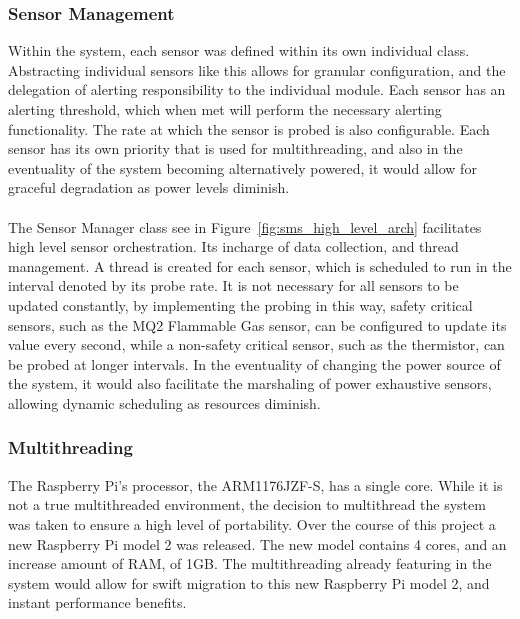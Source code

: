 \documentclass{article}
\begin{document}
\subsubsection{Sensor Management}
Within the system, each sensor was defined within its own individual class. Abstracting individual sensors like this allows for granular configuration, and the delegation of alerting responsibility to the individual module. Each sensor has an alerting threshold, which when met will perform the necessary alerting functionality. The rate at which the sensor is probed is also configurable. Each sensor has its own priority that is used for multithreading, and also in the eventuality of the system becoming alternatively powered, it would allow for graceful degradation as power levels diminish. \\\\
The Sensor Manager class see in Figure~\ref{fig:sms_high_level_arch} facilitates high level sensor orchestration. Its incharge of data collection, and thread management. A thread is created for each sensor, which is scheduled to run in the interval denoted by its probe rate. It is not necessary for all sensors to be updated constantly, by implementing the probing in this way, safety critical sensors, such as the MQ2 Flammable Gas sensor, can be configured to update its value every second, while a non-safety critical sensor, such as the thermistor, can be probed at longer intervals. In the eventuality of changing the power source of the system, it would also facilitate the marshaling of power exhaustive sensors, allowing dynamic scheduling as resources diminish. 

\subsubsection{Multithreading}
The Raspberry Pi’s processor, the ARM1176JZF-S, has a single core. While it is not a true multithreaded environment, the decision to multithread the system was taken to ensure a high level of portability. Over the course of this project a new Raspberry Pi model 2 was released. The new model contains 4 cores, and an increase amount of RAM, of 1GB. The multithreading already featuring in the system would allow for swift migration to this new Raspberry Pi model 2, and instant performance benefits.
\end{document}
